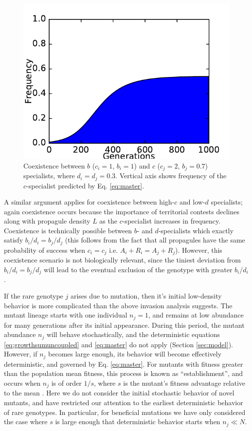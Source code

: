\documentclass[11pt]{article}
\begin{document}
\begin{figure}
\centering
\includegraphics[scale=0.7]{coex.pdf}
\caption{\label{fig:coex} Coexistence between $b$ ($c_i=1$, $b_i=1$) and $c$ ($c_j=2$, $b_j=0.7$) specialists, where $d_i=d_j=0.3$. Vertical axis shows frequency of the $c$-specialist predicted by Eq. \eqref{eq:master}.} 
\end{figure}

A similar argument applies for coexistence between high-$c$ and low-$d$ specialists; again coexistence occurs because the importance of territorial contests declines along with propagule density $L$ as the $c$-specialist increases in frequency. Coexistence is technically possible between $b$- and $d$-specialists which exactly satisfy $b_i/d_i=b_j/d_j$ (this follows from the fact that all propagules have the same probability of success when $c_i=c_j$ i.e. $A_i+R_i=A_j+R_j$). However, this coexistence scenario is not biologically relevant, since the tiniest deviation from $b_i/d_i=b_j/d_j$ will lead to the eventual exclusion of the genotype with greater $b_i/d_i$. 

If the rare genotype $j$ arises due to mutation, then it's initial low-density behavior is more complicated than the above invasion analysis suggests. The mutant lineage starts with one individual $n_j=1$, and remains at low abundance for many generations after its initial appearance. During this period, the mutant abundance $n_j$ will behave stochastically, and the deterministic equations \eqref{eq:growthsumuncoupled} and \eqref{eq:master} do not apply (Section \ref{sec:model}). However, if $n_j$ becomes large enough, its behavior will become effectively deterministic, and governed by Eq. \eqref{eq:master}. For mutants with fitness greater than the population mean fitness, this process is known as ``establishment'', and occurs when $n_j$ is of order $1/s$, where $s$ is the mutant's fitness advantage relative to the mean \citep{desai_2007}. Here we do not consider the initial stochastic behavior of novel mutants, and have restricted our attention to the earliest deterministic behavior of rare genotypes. In particular, for beneficial mutations we have only considered the case where $s$ is large enough that deterministic behavior starts when $n_j \ll N$.
\end{document}
